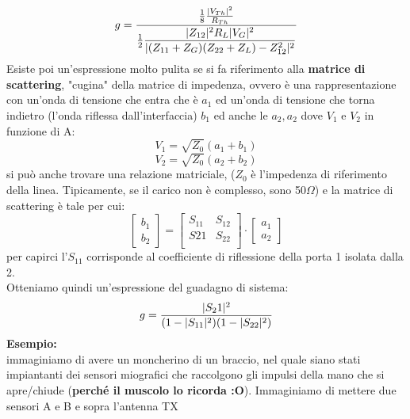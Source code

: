 \documentclass[oneside, 12pt]{extbook}
\DeclarePairedDelimiter{\abs}{\lvert}{\rvert}
\begin{document}
\begin{equation}
	g = \dfrac{\frac{1}{8}\frac{\abs{V_{Th}}^2}{R_{Th}}}{\frac{1}{2} \dfrac{\abs{Z_{12}}^2 R_L \abs{V_G}^2}{\abs{(Z_{11}+Z_G)(Z_{22}+Z_L) - Z_{12}^2}^2}}
\end{equation}
Esiste poi un'espressione molto pulita se si fa riferimento alla \textbf{matrice di scattering}, "cugina" della matrice di impedenza, ovvero è una rappresentazione con un'onda di tensione che entra che è $a_1$ ed un'onda di tensione che torna indietro (l'onda riflessa dall'interfaccia) $b_1$ ed anche le $a_2, a_2$ dove $V_1$ e $V_2$ in funzione di A:
\begin{equation}
	V_1 = \sqrt{Z_0}(a_1 + b_1)
\end{equation}
\begin{equation}
	V_2 = \sqrt{Z_0}(a_2 + b_2)
\end{equation}
si può anche trovare una relazione matriciale, ($Z_0$ è l'impedenza di riferimento della linea. Tipicamente, se il carico non è complesso, sono 50$\Omega$) e la matrice di scattering è tale per cui:\\ 
\begin{equation}
	\begin{bmatrix}
		b_1\\
		b_2
	\end{bmatrix} = 
	\begin{bmatrix}
		S_{11} & S_{12}\\
		S{21} & S_{22}\\
	\end{bmatrix} \cdot
	\begin{bmatrix}
		a_1\\
		a_2
	\end{bmatrix}
\end{equation}
per capirci l'$S_{11}$ corrisponde al coefficiente di riflessione della porta 1 isolata dalla 2.\\Otteniamo quindi un'espressione del guadagno di sistema: 
\begin{equation}
	g = \dfrac{\abs{S_21}^2}{(1-\abs{S_{11}}^2)(1 - \abs{S_{22}}^2)}
\end{equation}
\textbf{Esempio:}\\
immaginiamo di avere un moncherino di un braccio, nel quale siano stati impiantanti dei sensori miografici che raccolgono gli impulsi della mano che si apre/chiude (\textbf{perché il muscolo lo ricorda :O}). Immaginiamo di mettere due sensori A e B e sopra l'antenna TX\\
\end{document}
